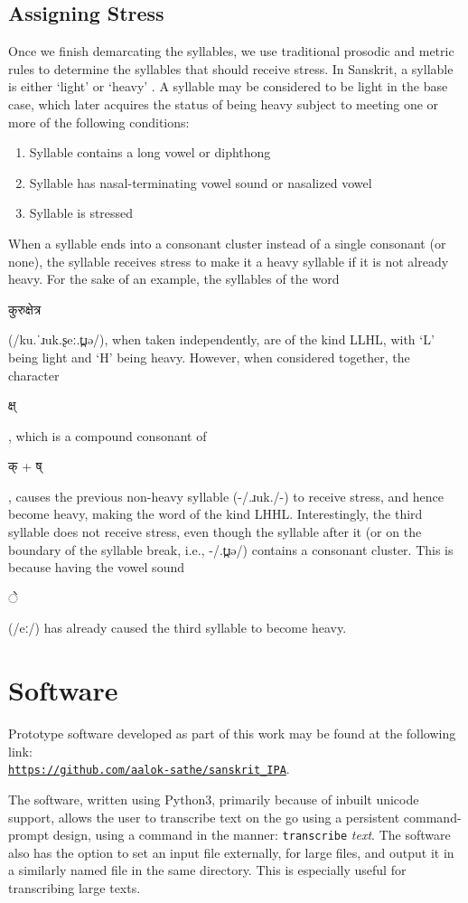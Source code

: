 \documentclass[10pt,a4paper]{article}
\newcommand{\sansk}[1]{\begin{sanskrit}#1\end{sanskrit}}
\begin{document}
\subsection{Assigning Stress}
Once we finish demarcating the syllables, we use traditional prosodic and metric rules to determine the syllables that should receive stress. In Sanskrit, a syllable is either `light' or `heavy' \cite{sridharan2005sanskrit}. A syllable may be considered to be light in the base case, which later acquires the status of being heavy subject to meeting one or more of the following conditions:
\begin{enumerate}
	\item Syllable contains a long vowel or diphthong
	\item Syllable has nasal-terminating vowel sound or nasalized vowel
	\item Syllable is stressed
\end{enumerate}

When a syllable ends into a consonant cluster instead of a single consonant (or none), the syllable receives stress to make it a heavy syllable if it is not already heavy.
For the sake of an example, the syllables of the word \sansk{कुरु{क्षे}त्र} (/ku.ˈɹuk.ʂeː.t̪ɹə/), when taken independently, are of the kind LLHL, with `L' being light and `H' being heavy. However, when considered together, the character \sansk{क्ष्}, which is a compound consonant of \sansk{क् + ष्}, causes the previous non-heavy syllable (-/.ɹuk./-) to receive stress, and hence become heavy, making the word of the kind LHHL. Interestingly, the third syllable does not receive stress, even though the syllable after it (or on the boundary of the syllable break, i.e., -/.t̪ɹə/) contains a consonant cluster. This is because having the vowel sound \sansk{े} (/eː/) has already caused the third syllable to become heavy.

\vspace{.3\baselineskip}

\section{Software}
Prototype software developed as part of this work may be found at the following link:\\
\hyperref{https://github.com/aalok-sathe/sanskrit_IPA}{}{}{\tt https://github.com/aalok-sathe/sanskrit\_IPA}.


The software, written using Python3, primarily because of inbuilt unicode support, allows the user to transcribe text on the go using a persistent command-prompt design, using a command in the manner: \texttt{transcribe} \textit{text}. The software also has the option to set an input file externally, for large files, and output it in a similarly named file in the same directory. This is especially useful for transcribing large texts.
\end{document}

